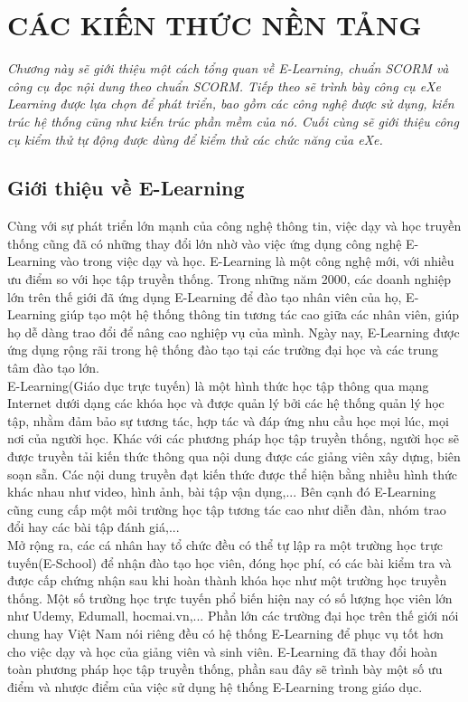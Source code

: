 \chapter{CÁC KIẾN THỨC NỀN TẢNG}

	\fontsize{12pt}{7pt}\selectfont
	\noindent\textit{Chương này sẽ giới thiệu một cách tổng quan về E-Learning, chuẩn SCORM và công cụ đọc nội dung theo chuẩn SCORM. Tiếp theo sẽ trình bày công cụ eXe Learning được lựa chọn để phát triển, bao gồm các công nghệ được sử dụng, kiến trúc hệ thống cũng như kiến trúc phần mềm của nó. Cuối cùng sẽ giới thiệu công cụ kiểm thử tự động được dùng để kiểm thử các chức năng của eXe.}


\section{Giới thiệu về E-Learning}
	Cùng với sự phát triển lớn mạnh của công nghệ thông tin, việc dạy và học truyền thống cũng đã có những thay đổi lớn nhờ vào việc ứng dụng công nghệ E-Learning vào trong việc dạy và học. E-Learning là một công nghệ mới, với nhiều ưu điểm so với học tập truyền thống. Trong những năm 2000, các doanh nghiệp lớn trên thế giới đã ứng dụng E-Learning để đào tạo nhân viên của họ, E-Learning giúp tạo một hệ thống thông tin tương tác cao giữa các nhân viên, giúp họ dễ dàng trao đổi để nâng cao nghiệp vụ của mình. Ngày nay, E-Learning được ứng dụng rộng rãi trong hệ thống đào tạo tại các trường đại học và các trung tâm đào tạo lớn.\\

	E-Learning(Giáo dục trực tuyến) là một hình thức học tập thông qua mạng Internet dưới dạng các khóa học và được quản lý bởi các hệ thống quản lý học tập, nhằm đảm bảo sự tương tác, hợp tác và đáp ứng nhu cầu học mọi lúc, mọi nơi của người học. Khác với các phương pháp học tập truyền thống, người học sẽ được truyền tải kiến thức thông qua nội dung được các giảng viên xây dựng, biên soạn sẵn. Các nội dung truyền đạt kiến thức được thể hiện bằng nhiều hình thức khác nhau như video, hình ảnh, bài tập vận dụng,... Bên cạnh đó E-Learning cũng cung cấp một môi trường học tập tương tác cao như diễn đàn, nhóm trao đổi hay các bài tập đánh giá,...\\

	Mở rộng ra, các cá nhân hay tổ chức đều có thể tự lập ra một trường học trực tuyến(E-School) để nhận đào tạo học viên, đóng học phí, có các bài kiểm tra và được cấp chứng nhận sau khi hoàn thành khóa học như một trường học truyền thống. Một số trường học trực tuyến phổ biến hiện nay có số lượng học viên lớn như Udemy, Edumall, hocmai.vn,... Phần lớn các trường đại học trên thế giới nói chung hay Việt Nam nói riêng đều có hệ thống E-Learning để phục vụ tốt hơn cho việc dạy và học của giảng viên và sinh viên. E-Learning đã thay đổi hoàn toàn phương pháp học tập truyền thống, phần sau đây sẽ trình bày một số ưu điểm và nhược điểm của việc sử dụng hệ thống E-Learning trong giáo dục.

